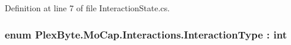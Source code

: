 Definition at line 7 of file Interaction\+State.\+cs.

\subsubsection[{\texorpdfstring{Interaction\+Type}{InteractionType}}]{\setlength{\rightskip}{0pt plus 5cm}enum {\bf Plex\+Byte.\+Mo\+Cap.\+Interactions.\+Interaction\+Type} \+: int\hspace{0.3cm}{\ttfamily [strong]}}\hypertarget{namespace_plex_byte_1_1_mo_cap_1_1_interactions_a6e7bea333446664bbce2bb296db25e31}{}\label{namespace_plex_byte_1_1_mo_cap_1_1_interactions_a6e7bea333446664bbce2bb296db25e31}
